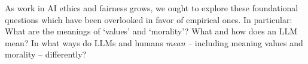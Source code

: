 
As work in AI ethics and fairness grows, we ought to explore these foundational questions which have been overlooked in favor of empirical ones.
In particular:
What are the meanings of `values' and `morality'?
What and how does an LLM mean?
In what ways do LLMs and humans \textit{mean} -- including meaning values and morality -- differently? 


